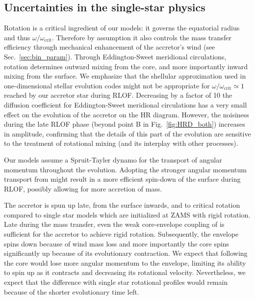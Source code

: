 \documentclass[twocolumn,twocolappendix,trackchanges]{aastex63}
\DeclareRobustCommand{\Figref}[1]{Fig.~\ref{#1}}
\DeclareRobustCommand{\Secref}[1]{Sec.~\ref{#1}}
\begin{document}
\subsection{Uncertainties in the single-star physics}
\label{sec:single_star_uncertainties}
Rotation is a critical ingredient of our models: it governs the
equatorial radius and thus $\omega/\omega_\mathrm{crit}$. Therefore by
assumption it also controls the mass transfer efficiency through
mechanical enhancement of the accretor's wind (see
\Secref{sec:bin_param}). Through Eddington-Sweet meridional
circulations, rotation determines outward mixing from the core, and
more importantly inward mixing from the surface.  We emphasize that
the shellular approximation used in one-dimensional stellar evolution
codes might not be appropriate for
$\omega/\omega_\mathrm{crit}\simeq 1$ reached by our accretor star
during RLOF. Decreasing by a factor of 10 the diffusion coefficient
for Eddington-Sweet meridional circulations has a very small effect on
the evolution of the accretor on the HR diagram. However, the noisiness during the
late RLOF phase (beyond point B in \Figref{fig:HRD_both}) increases in
amplitude, confirming that the details of this part of the evolution
are sensitive to the treatment of rotational mixing (and its interplay
with other processes). %

Our models assume a Spruit-Tayler dynamo \citep{spruit:02} for the
transport of angular momentum throughout the evolution. Adopting the
stronger angular momentum transport from \cite{fuller:19} might result
in a more efficient spin-down of the surface during RLOF, possibly
allowing for more accretion of mass.

The accretor is spun up late, from the surface inwards, and to
critical rotation compared to single star models which are initialized
at ZAMS with rigid rotation. Late during the mass transfer, even the
weak core-envelope coupling of \cite{spruit:02} is sufficient for
the accretor to achieve rigid rotation. Subsequently, the envelope
spins down because of wind mass loss and more importantly the core
spins significantly up because of its evolutionary contraction. We
expect that following \cite{fuller:19} the core would lose more
angular momentum to the envelope, limiting its ability to spin up as
it contracts and decreasing its rotational velocity.
Nevertheless, we expect that the difference with single star
rotational profiles would remain because of the shorter evolutionary time left.
\end{document}
